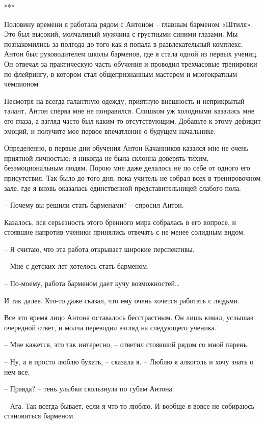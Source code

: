 \documentclass[
]{book}
\begin{document}
***

Половину времени я работала рядом с Антоном -- главным барменом «Штиля». Это был высокий, молчаливый мужчина с грустными синими глазами. Мы познакомились за полгода до того как я попала в развлекательный комплекс. Антон был руководителем школы барменов, где я стала одной из первых учениц. Он отвечал за практическую часть обучения и проводил трехчасовые тренировки по флейрингу, в котором стал общепризнанным мастером и многократным чемпионом

Несмотря на всегда галантную одежду, приятную внешность и неприкрытый талант, Антон сперва мне не понравился. Слишком уж холодными казались мне его глаза, а взгляд часто был каким-то отсутствующим. Добавьте к этому дефицит эмоций, и получите мое первое впечатление о будущем начальнике.

Определенно, в первые дни обучения Антон Качанников казался мне не очень приятной личностью: я никогда не была склонна доверять тихим, безэмоциональным людям. Порою мне даже делалось не по себе от одного его присутствия. Так было до того дня, пока учитель не собрал всех в тренировочном зале, где я вновь оказалась единственной представительницей слабого пола.

-- Почему вы решили стать барменами? -- спросил Антон.

Казалось, вся серьезность этого бренного мира собралась в его вопросе, и стоявшие напротив ученики принялись отвечать с не менее солидным видом.

-- Я считаю, что эта работа открывает широкие перспективы.

-- Мне с детских лет хотелось стать барменом.

-- По-моему, работа барменом дает кучу возможностей\ldots{}

И так далее. Кто-то даже сказал, что ему очень хочется работать с людьми.

Все это время лицо Антона оставалось бесстрастным. Он лишь кивал, услышав очередной ответ, и молча переводил взгляд на следующего ученика.

-- Мне кажется, это так интересно, -- ответил стоявший рядом со мной парень.

-- Ну, а я просто люблю бухать, -- сказала я. -- Люблю я алкоголь и хочу знать о нем все.

-- Правда? -- тень улыбки скользнула по губам Антона.

-- Ага. Так всегда бывает, если я что-то люблю. И вообще я вовсе не собираюсь становиться барменом.
\end{document}
